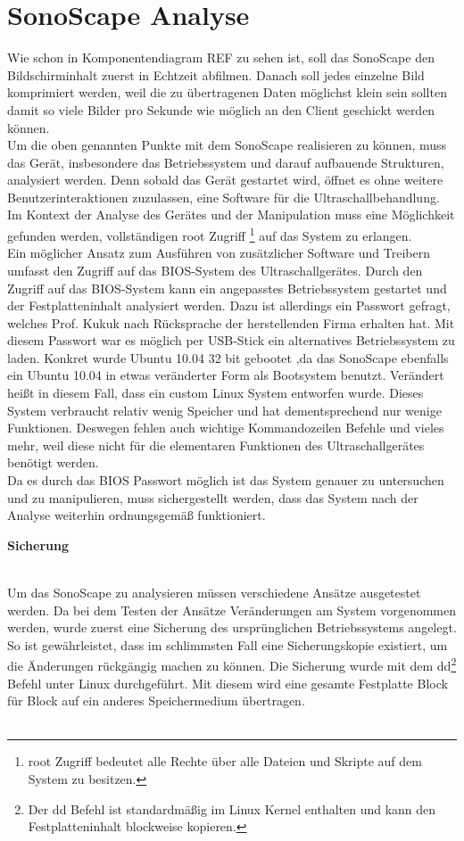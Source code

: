 \chapter{SonoScape Analyse}
Wie schon in Komponentendiagram REF zu sehen ist, soll das SonoScape den Bildschirminhalt zuerst in Echtzeit abfilmen. Danach soll jedes einzelne Bild komprimiert werden, weil die zu übertragenen Daten möglichst klein sein sollten damit so viele Bilder pro Sekunde wie möglich an den Client geschickt werden können.\\
Um die oben genannten Punkte mit dem SonoScape realisieren zu können, muss das Gerät, insbesondere das Betriebssystem und darauf aufbauende Strukturen, analysiert werden. Denn sobald das Gerät gestartet wird, öffnet es ohne weitere  Benutzerinteraktionen zuzulassen, eine Software für die Ultraschallbehandlung. Im Kontext der Analyse des Gerätes und der Manipulation muss eine Möglichkeit gefunden werden, vollständigen root Zugriff \footnote{root Zugriff bedeutet alle Rechte über alle Dateien und Skripte auf dem System zu besitzen.} auf das System zu erlangen.\\ 
Ein möglicher Ansatz zum Ausführen von zusätzlicher Software und Treibern umfasst den Zugriff auf das BIOS-System des Ultraschallgerätes. Durch den Zugriff auf das BIOS-System kann ein angepasstes Betriebssystem gestartet und der Festplatteninhalt analysiert werden. Dazu ist allerdings ein Passwort gefragt, welches Prof. Kukuk nach Rücksprache der herstellenden Firma erhalten hat. Mit diesem Passwort war es möglich per USB-Stick ein alternatives Betriebssystem zu laden. Konkret wurde Ubuntu 10.04 32 bit gebootet ,da das SonoScape ebenfalls ein Ubuntu 10.04 in etwas veränderter Form als Bootsystem benutzt. Verändert heißt in diesem Fall, dass ein custom Linux System entworfen wurde. Dieses System verbraucht relativ wenig Speicher und hat dementsprechend nur wenige Funktionen. Deswegen fehlen auch wichtige Kommandozeilen Befehle und vieles mehr, weil diese nicht für die elementaren Funktionen des Ultraschallgerätes benötigt werden.\\
Da es durch das BIOS Passwort möglich ist das System genauer zu untersuchen und zu manipulieren, muss sichergestellt werden, dass das System nach der Analyse weiterhin ordnungsgemäß funktioniert. 
\clearpage
\begin{large}
\textbf{Sicherung}\\\\
\end{large}
Um das SonoScape zu analysieren müssen verschiedene Ansätze ausgetestet werden. Da bei dem Testen der Ansätze Veränderungen am System vorgenommen werden, wurde zuerst eine Sicherung des ursprünglichen Betriebssystems angelegt. So ist gewährleistet, dass im schlimmsten Fall eine Sicherungskopie existiert, um die Änderungen rückgängig machen zu können. Die Sicherung wurde mit dem dd\footnote{Der dd Befehl ist standardmäßig im Linux Kernel enthalten und kann den Festplatteninhalt blockweise kopieren. } Befehl unter Linux durchgeführt. Mit diesem wird eine gesamte Festplatte Block für Block auf ein anderes Speichermedium übertragen.\\\\
